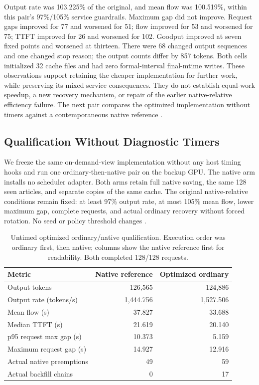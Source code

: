 \documentclass[10pt]{article}
\begin{document}
Output rate was 103.225\% of the original, and mean flow was 100.519\%, within this pair's 97\%/105\% service guardrails. Maximum gap did not improve. Request gaps improved for 77 and worsened for 51; flow improved for 53 and worsened for 75; TTFT improved for 26 and worsened for 102. Goodput improved at seven fixed points and worsened at thirteen. There were 68 changed output sequences and one changed stop reason; the output counts differ by 857 tokens. Both cells initialized 32 cache files and had zero formal-interval final-mtime writes. These observations support retaining the cheaper implementation for further work, while preserving its mixed service consequences. They do not establish equal-work speedup, a new recovery mechanism, or repair of the earlier native-relative efficiency failure. The next pair compares the optimized implementation without timers against a contemporaneous native reference \cite{nativelazy}.

\subsection{Qualification Without Diagnostic Timers}
We freeze the same on-demand-view implementation without any host timing hooks and run one ordinary-then-native pair on the backup GPU. The native arm installs no scheduler adapter. Both arms retain full native saving, the same 128 seen articles, and separate copies of the same cache. The original native-relative conditions remain fixed: at least 97\% output rate, at most 105\% mean flow, lower maximum gap, complete requests, and actual ordinary recovery without forced rotation. No seed or policy threshold changes \cite{nativelazyperf}.

\begin{table}[t]
\centering\small
\caption{Untimed optimized ordinary/native qualification. Execution order was ordinary first, then native; columns show the native reference first for readability. Both completed 128/128 requests.}
\label{tab:nativelazyperf}
\begin{tabular}{lrr}
\toprule
Metric & Native reference & Optimized ordinary \\
\midrule
Output tokens & 126,565 & 124,886 \\
Output rate (tokens/s) & 1,444.756 & 1,527.506 \\
Mean flow (s) & 37.827 & 33.688 \\
Median TTFT (s) & 21.619 & 20.140 \\
p95 request max gap (s) & 10.373 & 5.159 \\
Maximum request gap (s) & 14.927 & 12.916 \\
Actual native preemptions & 49 & 59 \\
Actual backfill chains & 0 & 17 \\
\bottomrule
\end{tabular}
\end{table}
\end{document}
